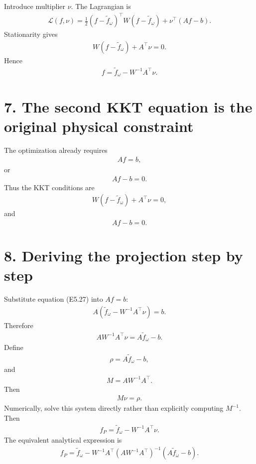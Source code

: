 \documentclass[11pt]{article}
\begin{document}
Introduce multiplier \(\nu\). The Lagrangian is
\begin{align}
\boxed{\mathcal L(f,\nu)=\frac12(f-\widetilde f_\omega)^\top W(f-\widetilde f_\omega)+\nu^\top(Af-b).}
\tag{E5.25}
\end{align}
Stationarity gives
\begin{align}
\boxed{W(f-\widetilde f_\omega)+A^\top\nu=0.}
\tag{E5.26}
\end{align}
Hence
\begin{align}
\boxed{f=\widetilde f_\omega-W^{-1}A^\top\nu.}
\tag{E5.27}
\end{align}

\section*{7. The second KKT equation is the original physical constraint}

The optimization already requires
\begin{align}
\boxed{Af=b,}
\tag{E5.28}
\end{align}
or
\begin{align}
\boxed{Af-b=0.}
\tag{E5.29}
\end{align}
Thus the KKT conditions are
\begin{align}
\boxed{W(f-\widetilde f_\omega)+A^\top\nu=0,}
\tag{E5.30}
\end{align}
and
\begin{align}
\boxed{Af-b=0.}
\tag{E5.31}
\end{align}

\section*{8. Deriving the projection step by step}

Substitute equation (E5.27) into \(Af=b\):
\begin{align}
A\left(\widetilde f_\omega-W^{-1}A^\top\nu\right)=b.
\end{align}
Therefore
\begin{align}
AW^{-1}A^\top\nu=A\widetilde f_\omega-b.
\end{align}
Define
\begin{align}
\boxed{\rho=A\widetilde f_\omega-b,}
\tag{E5.32}
\end{align}
and
\begin{align}
\boxed{M=AW^{-1}A^\top.}
\tag{E5.33}
\end{align}
Then
\begin{align}
\boxed{M\nu=\rho.}
\tag{E5.34}
\end{align}
Numerically, solve this system directly rather than explicitly computing \(M^{-1}\). Then
\begin{align}
\boxed{f_P=\widetilde f_\omega-W^{-1}A^\top\nu.}
\tag{E5.35}
\end{align}
The equivalent analytical expression is
\begin{align}
\boxed{f_P=\widetilde f_\omega-W^{-1}A^\top(AW^{-1}A^\top)^{-1}(A\widetilde f_\omega-b).}
\tag{E5.36}
\end{align}
\end{document}
